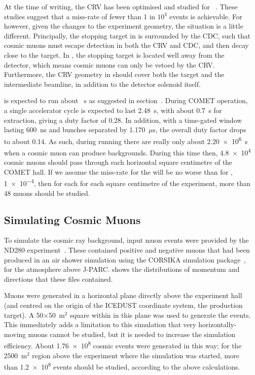 At the time of writing, the \ac{CRV} has been optimised and studied for \phaseI~\cite{TDR2016,CM18:CRV,CM20:CRV}.
These studies suggest that a miss-rate of fewer than 1 in $10^4$ events is achievable.
For \phaseII however, given the changes to the experiment geometry, the situation is a little different.
Principally, the stopping target in \phaseI is surrounded by the \ac{CDC}, such that cosmic muons must escape detection in both the \ac{CRV} and \ac{CDC}, and then decay close to the target.
In \phaseII, the stopping target is located well away from the detector, which means cosmic muons can only be vetoed by the \ac{CRV}.
Furthermore, the \ac{CRV} geometry in \phaseII should cover both the target and the intermediate beamline, in addition to the detector solenoid itself.

\phaseII is expected to run about \VarRunTime~s as suggested in section~.
During COMET operation, a single accelerator cycle is expected to last 2.48~s, with about 0.7~s for extraction, giving a duty factor of 0.28.
In addition, with a time-gated window lasting 600~ns and bunches separated by 1.170~$\mu$s, the overall duty factor drops to about 0.14.
As such, during \phaseII running there are really only about \num{2.20e6}~s when a cosmic muon can produce backgrounds.
During this time then, \num{4.8e4} cosmic muons should pass through each horizontal square centimetre of the COMET hall.
If we assume the miss-rate for the \phaseII will be no worse than for \phaseI, \ie \num{1e-4}, then for each for each square centimetre of the experiment, more than 48 muons should be studied.

\subsection{Simulating Cosmic Muons}
To simulate the cosmic ray background, input muon events were provided by the ND280 experiment~\cite{George:2010aca}.
These contained positive and negative muons that had been produced in an air shower simulation using the CORSIKA simulation package~\cite{Corsika}, for the atmosphere above J-PARC.
 shows the distributions of momentum and directions that these files contained.

Muons were generated in a horizontal plane directly above the experiment hall (and centred on the origin of the ICEDUST coordinate system, the production target).
A 50$\times$50~m${}^2$ square within in this plane was used to generate the events.
This immediately adds a limitation to this simulation that very horizontally-moving muons cannot be studied, but it is needed to increase the simulation efficiency.
About \num{1.76e8} cosmic events were generated in this way; for the 2500~m${}^2$ region above the experiment where the simulation was started, more than \num{1.2e8} events should be studied, according to the above calculations.

